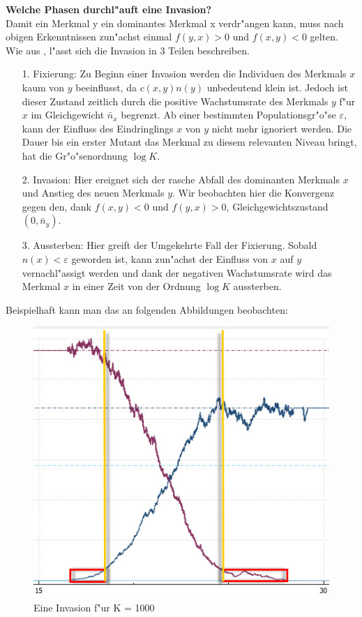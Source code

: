 \documentclass[11pt, a4paper, german]{article}
\theoremstyle{plain}
\newcommand{\eps}{\ensuremath{\varepsilon}}
\begin{document}
	\textbf{Welche Phasen durchl"auft eine Invasion?}\\
	Damit ein Merkmal y ein dominantes Merkmal x verdr"angen kann, muss nach obigen Erkenntnissen zun"achst einmal $ f(y,x) > 0 $ und $ f(x,y) < 0 $ gelten.\\
	Wie aus \cite{Silke}, l"asst sich die Invasion in 3 Teilen beschreiben. 
	\begin{itemize}
		\item [1.] Fixierung: Zu Beginn einer Invasion werden die Individuen des Merkmals $ x $ kaum von $ y $ beeinflusst, da $ c(x,y)n(y) $ unbedeutend klein ist. Jedoch ist dieser Zustand zeitlich durch die positive Wachstumsrate des Merkmals $ y $ f"ur $ x $ im Gleichgewicht $ \bar{n}_x $ begrenzt. Ab einer bestimmten Populationsgr"o"se $ \eps $, kann der Einfluss des Eindringlings $ x $ von $ y $ nicht mehr ignoriert werden. Die Dauer bis ein erster Mutant das Merkmal zu diesem relevanten Niveau bringt, hat die Gr"o"senordnung $ \log K $.
		\item [2.] Invasion: Hier ereignet sich der rasche Abfall des dominanten Merkmals $ x $ und Anstieg des neuen Merkmals $ y $. Wir beobachten hier die Konvergenz gegen den, dank $ f(x,y) < 0 $ und $ f(y,x) > 0 $, Gleichgewichtszustand $ (0,\bar{n}_y) $.
		\item [3.] Aussterben: Hier greift der Umgekehrte Fall der Fixierung. Sobald $ n(x) < \eps $ geworden ist, kann zun"achst der Einfluss von $ x $ auf $ y $ vernachl"assigt werden und dank der negativen Wachstumsrate wird das Merkmal $ x $ in einer Zeit von der Ordnung $ \log K $ aussterben.
	\end{itemize}
	Beispielhaft kann man das an folgenden Abbildungen beobachten:\\
	\begin{minipage}{0.7 \textwidth}
	\begin{figure}[H]
		\centering
		\includegraphics[width=1 \linewidth]{./Pictures/Invasion2}
		\caption[Invasion]{Eine Invasion f"ur K = 1000}
		\label{Invasionsphasen}
	\end{figure}
	\end{minipage}
\end{document}
